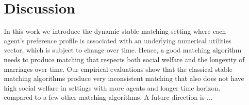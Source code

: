 \section{Discussion}
In this work we introduce the dynamic stable matching setting where each agent's preference profile is associated with an underlying numerical utilities vector, which is subject to change over time. Hence, a good matching algorithm needs to produce matching that respects both social welfare and the longevity of marriages over time. Our empirical evaluations show that the classical stable matching algorithms produce very inconsistent matching that also does not have high social welfare in settings with more agents and longer time horizon, compared to a few other matching algorithms. A future direction is ...